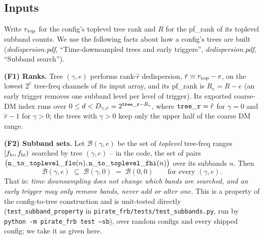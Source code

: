 \documentclass{article}
\numberwithin{equation}{section}   %
\newcommand{\ddnotes}[1]{{\em dedispersion.pdf}, ``#1''}
\begin{document}
\subsection{Inputs}
\label{ssec:restriction_inputs}

Write $r_{\rm top}$ for the config's toplevel tree rank and $R$ for the pf\_rank of its
toplevel subband counts. We use the following facts about how a config's trees are built
(\ddnotes{Time-downsampled trees and early triggers}, \ddnotes{Subband search}).

\medskip
\par\noindent
{\bf (F1) Ranks.} Tree $(\gamma,e)$ performs rank-$\hat r$ dedispersion, $\hat r \equiv
r_{\rm top} - e$, on the lowest $2^{\hat r}$ tree-freq channels of its input array, and its
pf\_rank is $R_e = R - e$ (an early trigger removes one subband level per level of trigger).
Its exported coarse-DM index runs over $0 \le d < D_{\gamma,e} = 2^{{\tt tree\_r} - R_e}$,
where ${\tt tree\_r} = \hat r$ for $\gamma = 0$ and $\hat r - 1$ for $\gamma > 0$; the trees
with $\gamma > 0$ keep only the upper half of the coarse DM range.

\medskip
\par\noindent
{\bf (F2) Subband sets.} Let $\mathcal{B}(\gamma,e)$ be the set of {\em toplevel} tree-freq
ranges $[f_{\rm lo}, f_{\rm hi})$ searched by tree $(\gamma,e)$ -- in the code, the set of
pairs $\big({\tt n\_to\_toplevel\_flo}(n), {\tt n\_to\_toplevel\_fhi}(n)\big)$ over its
subbands $n$. Then
\begin{equation}
\mathcal{B}(\gamma, e) \;\subseteq\; \mathcal{B}(\gamma, 0) \;=\; \mathcal{B}(0,0)
\qquad \mbox{for every $(\gamma,e)$.}
\label{eq:subband_property}
\end{equation}
That is: {\em time downsampling does not change which bands are searched, and an early
trigger may only remove bands, never add or alter one.} This is a property of the
config-to-tree construction and is unit-tested directly ({\tt test\_subband\_property} in
{\tt pirate\_frb/tests/test\_subbands.py}, run by {\tt python -m pirate\_frb test --sb}), over
random configs and every shipped config; we take it as given here.
\end{document}
